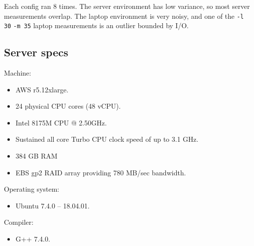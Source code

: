 \documentclass[10pt]{article}
\begin{document}
Each config ran 8 times.  The server environment has low variance, so most server measurements overlap.  The laptop environment is very noisy, and one of the \texttt{-l 30} \texttt{-m 35} laptop measurements is an outlier bounded by I/O.

\pagebreak
\subsection{Server specs}


Machine:
\begin{itemize}
\item AWS r5.12xlarge.
\item 24 physical CPU cores (48 vCPU).
\item Intel 8175M CPU @ 2.50GHz.
\item Sustained all core Turbo CPU clock speed of up to 3.1 GHz.
\item 384 GB RAM
\item EBS gp2 RAID array providing 780 MB/sec bandwidth.
\end{itemize}

Operating system:
\begin{itemize}
\item Ubuntu 7.4.0 -- 18.04.01.
\end{itemize}

Compiler:
\begin{itemize}
\item G++ 7.4.0.
\end{itemize}
\end{document}
